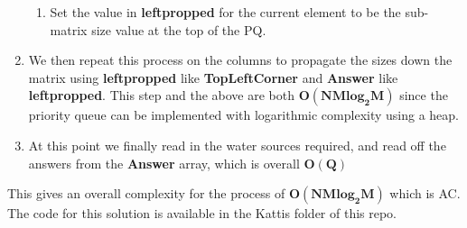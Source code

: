\documentclass{article}
\begin{document}
\begin{enumerate}
\begin{enumerate}
            \item Set the value in \textbf{leftpropped} for the current element to be the sub-matrix size value at the top of the PQ.
        \end{enumerate}
    \item We then repeat this process on the columns to propagate the sizes down the matrix using \textbf{leftpropped} like \textbf{TopLeftCorner} and \textbf{Answer} like \textbf{leftpropped}. This step and the above are both $\mathbf{O(NMlog_2{M})}$ since the priority queue can be implemented with logarithmic complexity using a heap.
    \item At this point we finally read in the water sources required, and read off the answers from the \textbf{Answer} array, which is overall $\mathbf{O(Q)}$
\end{enumerate}
This gives an overall complexity for the process of $\mathbf{O(NMlog_2{M})}$ which is AC. \\

\noindent The code for this solution is available in the Kattis folder of this repo.
\end{document}
